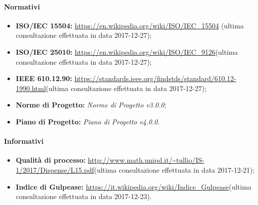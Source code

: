 		\paragraph{Normativi}
			\begin{itemize}
				\item \textbf{ISO/IEC 15504:} \url{https://en.wikipedia.org/wiki/ISO/IEC\_15504} (ultima consultazione effettuata in data 2017-12-27);
				\item \textbf{ISO/IEC 25010:} \url{https://en.wikipedia.org/wiki/ISO/IEC\_9126}(ultima consultazione effettuata in data 2017-12-27);
				\item \textbf{IEEE 610.12.90:} \url{https://standards.ieee.org/findstds/standard/610.12-1990.html}(ultima consultazione effettuata in data 2017-12-27);
				\item \textbf{Norme di Progetto:} \emph{Norme di Progetto v3.0.0};
				\item \textbf{Piano di Progetto:} \emph{Piano di Progetto v4.0.0}.
			\end{itemize}

		\paragraph{Informativi} 
			\begin{itemize}
				\item \textbf{Qualità di processo:} \url{http://www.math.unipd.it/~tullio/IS-1/2017/Dispense/L15.pdf}(ultima consultazione effettuata in data 2017-12-21);
				\item \textbf{Indice di Gulpease:} \url{https://it.wikipedia.org/wiki/Indice\_Gulpease}(ultima consultazione effettuata in data 2017-12-23).
			\end{itemize}